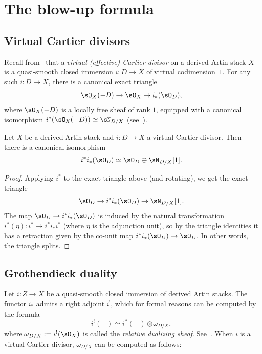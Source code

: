 \section{The blow-up formula}\label{sec:blowup}

\subsection{Virtual Cartier divisors}

Recall from~\cite{KhanBlowup} that a \emph{virtual (effective) Cartier divisor} on a derived Artin stack $X$ is a quasi-smooth closed immersion $i : D \to X$ of virtual codimension~$1$. For any such $i : D \to X$, there is a canonical exact triangle
\[
\sO_X(-D) \to \sO_X \to i_*(\sO_D),
\]
where $\sO_X(-D)$ is a locally free sheaf of rank $1$, equipped with a canonical isomorphism $i^*(\sO_X(-D)) \simeq \sN_{D/X}$ (see~\cite[3.2.3 and 3.2.9]{KhanBlowup}).

\begin{lemm}\label{lem:i^*i_*(O_D)}
Let $X$ be a derived Artin stack and $i : D \to X$ a virtual Cartier divisor. Then there is a canonical isomorphism
\[
i^*i_*(\sO_D) \simeq \sO_D \oplus \sN_{D/X}[1].
\]
\end{lemm}

\begin{proof}
Applying $i^*$ to the exact triangle above (and rotating), we get the exact triangle
\[
\sO_D \to i^*i_*(\sO_D) \to \sN_{D/X}[1].
\]
The map $\sO_D \to i^*i_*(\sO_D)$ is induced by the natural transformation $i^*(\eta) : i^* \to i^*i_*i^*$ (where $\eta$ is the adjunction unit), so by the triangle identities it has a retraction given by the co-unit map $i^*i_*(\sO_D) \to \sO_D$. In other words, the triangle splits.
\end{proof}

\subsection{Grothendieck duality}

Let $i : Z \to X$ be a quasi-smooth closed immersion of derived Artin stacks. The functor $i_*$ admits a right adjoint $i^!$, which for formal reasons can be computed by the formula
\[
i^!(-) \simeq i^*(-) \otimes \omega_{D/X},
\]
where $\omega_{D/X} := i^!(\sO_X)$ is called the \emph{relative dualizing sheaf}. See~\cite[Corollary 6.4.2.7]{SAG-20180204}. When $i$ is a virtual Cartier divisor, $\omega_{D/X}$ can be computed as follows:

